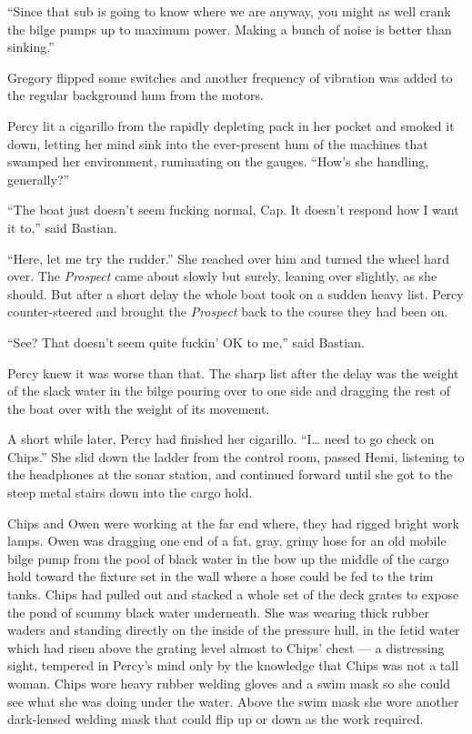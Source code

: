 \documentclass[
]{scrbook}
\begin{document}
``Since that sub is going to know where we are anyway, you might as well
crank the bilge pumps up to maximum power. Making a bunch of noise is
better than sinking.''

Gregory flipped some switches and another frequency of vibration was
added to the regular background hum from the motors.

Percy lit a cigarillo from the rapidly depleting pack in her pocket and
smoked it down, letting her mind sink into the ever-present hum of the
machines that swamped her environment, ruminating on the gauges. ``How's
she handling, generally?''

``The boat just doesn't seem fucking normal, Cap. It doesn't respond how
I want it to,'' said Bastian.

``Here, let me try the rudder.'' She reached over him and turned the
wheel hard over. The \emph{Prospect} came about slowly but surely,
leaning over slightly, as she should. But after a short delay the whole
boat took on a sudden heavy list. Percy counter-steered and brought the
\emph{Prospect} back to the course they had been on.

``See? That doesn't seem quite fuckin' OK to me,'' said Bastian.

Percy knew it was worse than that. The sharp list after the delay was
the weight of the slack water in the bilge pouring over to one side and
dragging the rest of the boat over with the weight of its movement.

\bigskip

A short while later, Percy had finished her cigarillo. ``I\ldots{} need
to go check on Chips.'' She slid down the ladder from the control room,
passed Hemi, listening to the headphones at the sonar station, and
continued forward until she got to the steep metal stairs down into the
cargo hold.

Chips and Owen were working at the far end where, they had rigged bright
work lamps. Owen was dragging one end of a fat, gray, grimy hose for an
old mobile bilge pump from the pool of black water in the bow up the
middle of the cargo hold toward the fixture set in the wall where a hose
could be fed to the trim tanks. Chips had pulled out and stacked a whole
set of the deck grates to expose the pond of scummy black water
underneath. She was wearing thick rubber waders and standing directly on
the inside of the pressure hull, in the fetid water which had risen
above the grating level almost to Chips' chest --- a distressing sight,
tempered in Percy's mind only by the knowledge that Chips was not a tall
woman. Chips wore heavy rubber welding gloves and a swim mask so she
could see what she was doing under the water. Above the swim mask she
wore another dark-lensed welding mask that could flip up or down as the
work required.
\end{document}
